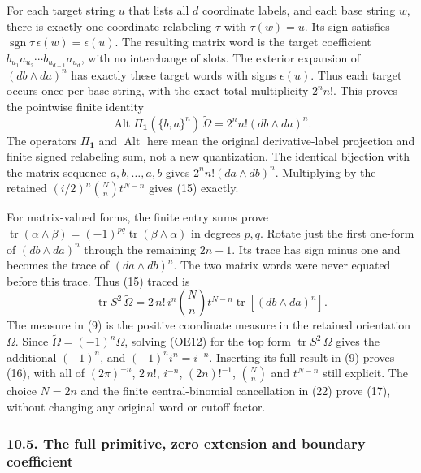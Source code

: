 \documentclass[
  11pt,
]{article}
\begin{document}
For each target string \(u\) that lists all \(d\) coordinate labels, and
each base string \(w\), there is exactly one coordinate relabeling
\(\tau\) with \(\tau(w)=u\). Its sign satisfies
\(\operatorname{sgn}\tau\,\epsilon(w)=\epsilon(u)\). The resulting
matrix word is the target coefficient
\(b_{u_1}a_{u_2}\cdots b_{u_{d-1}}a_{u_d}\), with no interchange of
slots. The exterior expansion of \((db\wedge da)^n\) has exactly these
target words with signs \(\epsilon(u)\). Thus each target occurs once
per base string, with the exact total multiplicity \(2^n n!\). This
proves the pointwise finite identity \[
\operatorname{Alt}\Pi_{\mathbf1}(\{b,a\}^n)
                         \,\widetilde\Omega
      =2^n n!(db\wedge da)^n.
\tag{OE11}
\] The operators \(\Pi_{\mathbf1}\) and \(\operatorname{Alt}\) here mean
the original derivative-label projection and finite signed relabeling
sum, not a new quantization. The identical bijection with the matrix
sequence \(a,b,\ldots,a,b\) gives \(2^n n!(da\wedge db)^n\). Multiplying
by the retained \((i/2)^n\binom Nn t^{N-n}\) gives (15) exactly.

For matrix-valued forms, the finite entry sums prove
\(\operatorname{tr}(\alpha\wedge\beta)
=(-1)^{pq}\operatorname{tr}(\beta\wedge\alpha)\) in degrees \(p,q\).
Rotate just the first one-form of \((db\wedge da)^n\) through the
remaining \(2n-1\). Its trace has sign minus one and becomes the trace
of \((da\wedge db)^n\). The two matrix words were never equated before
this trace. Thus (15) traced is \[
\operatorname{tr}S^2\,\widetilde\Omega
   =2\,n!\,i^n\binom Nn t^{N-n}
                    \operatorname{tr}[(db\wedge da)^n].
\tag{OE12}
\] The measure in (9) is the positive coordinate measure in the retained
orientation \(\Omega\). Since \(\widetilde\Omega=(-1)^n\Omega\), solving
(OE12) for the top form \(\operatorname{tr}S^2\,\Omega\) gives the
additional \((-1)^n\), and \((-1)^ni^n=i^{-n}\). Inserting its full
result in (9) proves (16), with all of \((2\pi)^{-n}\), \(2\,n!\),
\(i^{-n}\), \((2n)!^{-1}\), \(\binom Nn\) and \(t^{N-n}\) still
explicit. The choice \(N=2n\) and the finite central-binomial
cancellation in (22) prove (17), without changing any original word or
cutoff factor.

\subsubsection{10.5. The full primitive, zero extension and boundary
coefficient}\label{the-full-primitive-zero-extension-and-boundary-coefficient}
\end{document}
